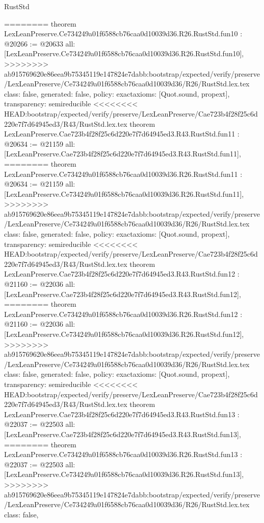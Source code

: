 \begin{lexlean}{RustStd}
\begin{coremodule}
{\begin{coremodule}
{{{{{{{{{{{{{========
theorem LexLeanPreserve.Ce734249a01f6588cb76caa0d10039d36.R26.RustStd.fun10 : @20266 := @20633 {
  all: [LexLeanPreserve.Ce734249a01f6588cb76caa0d10039d36.R26.RustStd.fun10],
>>>>>>>> ab915769620e86eea9b75345119e147824e7dabb:bootstrap/expected/verify/preserve/LexLeanPreserve/Ce734249a01f6588cb76caa0d10039d36/R26/RustStd.lex.tex
  class: false,
  generated: false,
  policy: exact{axioms: [Quot.sound, propext]},
  transparency: semireducible
}
<<<<<<<< HEAD:bootstrap/expected/verify/preserve/LexLeanPreserve/Cae723b4f28f25c6d220e7f7d64945ed3/R43/RustStd.lex.tex
theorem LexLeanPreserve.Cae723b4f28f25c6d220e7f7d64945ed3.R43.RustStd.fun11 : @20634 := @21159 {
  all: [LexLeanPreserve.Cae723b4f28f25c6d220e7f7d64945ed3.R43.RustStd.fun11],
========
theorem LexLeanPreserve.Ce734249a01f6588cb76caa0d10039d36.R26.RustStd.fun11 : @20634 := @21159 {
  all: [LexLeanPreserve.Ce734249a01f6588cb76caa0d10039d36.R26.RustStd.fun11],
>>>>>>>> ab915769620e86eea9b75345119e147824e7dabb:bootstrap/expected/verify/preserve/LexLeanPreserve/Ce734249a01f6588cb76caa0d10039d36/R26/RustStd.lex.tex
  class: false,
  generated: false,
  policy: exact{axioms: [Quot.sound, propext]},
  transparency: semireducible
}
<<<<<<<< HEAD:bootstrap/expected/verify/preserve/LexLeanPreserve/Cae723b4f28f25c6d220e7f7d64945ed3/R43/RustStd.lex.tex
theorem LexLeanPreserve.Cae723b4f28f25c6d220e7f7d64945ed3.R43.RustStd.fun12 : @21160 := @22036 {
  all: [LexLeanPreserve.Cae723b4f28f25c6d220e7f7d64945ed3.R43.RustStd.fun12],
========
theorem LexLeanPreserve.Ce734249a01f6588cb76caa0d10039d36.R26.RustStd.fun12 : @21160 := @22036 {
  all: [LexLeanPreserve.Ce734249a01f6588cb76caa0d10039d36.R26.RustStd.fun12],
>>>>>>>> ab915769620e86eea9b75345119e147824e7dabb:bootstrap/expected/verify/preserve/LexLeanPreserve/Ce734249a01f6588cb76caa0d10039d36/R26/RustStd.lex.tex
  class: false,
  generated: false,
  policy: exact{axioms: [Quot.sound, propext]},
  transparency: semireducible
}
<<<<<<<< HEAD:bootstrap/expected/verify/preserve/LexLeanPreserve/Cae723b4f28f25c6d220e7f7d64945ed3/R43/RustStd.lex.tex
theorem LexLeanPreserve.Cae723b4f28f25c6d220e7f7d64945ed3.R43.RustStd.fun13 : @22037 := @22503 {
  all: [LexLeanPreserve.Cae723b4f28f25c6d220e7f7d64945ed3.R43.RustStd.fun13],
========
theorem LexLeanPreserve.Ce734249a01f6588cb76caa0d10039d36.R26.RustStd.fun13 : @22037 := @22503 {
  all: [LexLeanPreserve.Ce734249a01f6588cb76caa0d10039d36.R26.RustStd.fun13],
>>>>>>>> ab915769620e86eea9b75345119e147824e7dabb:bootstrap/expected/verify/preserve/LexLeanPreserve/Ce734249a01f6588cb76caa0d10039d36/R26/RustStd.lex.tex
  class: false,
}}}}}}}}}}}}}}}}}
\end{coremodule}}
\end{coremodule}
\end{lexlean}
